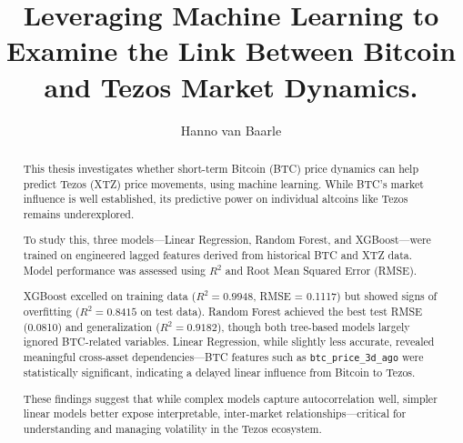 \documentclass[a0,portrait]{hogent-poster}
\title{Leveraging Machine Learning to Examine the Link Between Bitcoin and Tezos Market Dynamics.}
\author{Hanno van Baarle}
\begin{document}
\maketitle

\begin{abstract}
This thesis investigates whether short-term Bitcoin (BTC) price dynamics can help predict Tezos (XTZ) price movements, using machine learning. While BTC’s market influence is well established, its predictive power on individual altcoins like Tezos remains underexplored.

To study this, three models—Linear Regression, Random Forest, and XGBoost—were trained on engineered lagged features derived from historical BTC and XTZ data. Model performance was assessed using $R^2$ and Root Mean Squared Error (RMSE).

XGBoost excelled on training data ($R^2 = 0.9948$, RMSE = 0.1117) but showed signs of overfitting ($R^2 = 0.8415$ on test data). Random Forest achieved the best test RMSE (0.0810) and generalization ($R^2 = 0.9182$), though both tree-based models largely ignored BTC-related variables. Linear Regression, while slightly less accurate, revealed meaningful cross-asset dependencies—BTC features such as \texttt{btc\_price\_3d\_ago} were statistically significant, indicating a delayed linear influence from Bitcoin to Tezos.

These findings suggest that while complex models capture autocorrelation well, simpler linear models better expose interpretable, inter-market relationships—critical for understanding and managing volatility in the Tezos ecosystem.
\end{abstract}
\end{document}
